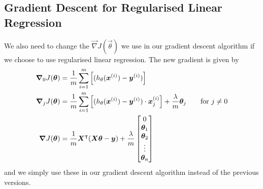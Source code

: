 \subsection{Gradient Descent for Regularised Linear Regression}
We also need to change the $\vec{\nabla}J(\vec{\theta})$ we use in our gradient descent algorithm if we choose to use regularised linear regression. The new gradient is given
by
\begin{align}
    \bm{\nabla}_0 J(\bm{\theta}) &= \frac{1}{m} \sum_{i=1}^{m}\left[(h_{\theta}(\bm{x}^{(i)})-\bm{y}^{(i)})\right] \\
    \bm{\nabla}_j J(\bm{\theta}) &= \frac{1}{m} \sum_{i=1}^{m}\left[(h_{\theta}(\bm{x}^{(i)})-\bm{y}^{(i)})\cdot\bm{x}^{(i)}_j\right] + \frac{\lambda}{m}\bm{\theta}_j \quad\quad \textrm{for } j \ne 0 \\
    \bm{\nabla} J(\bm{\theta}) &= \frac{1}{m} \bm{X}^{\intercal}(\bm{X\theta} - \bm{y}) + \frac{\lambda}{m}\begin{bmatrix}
        0 \\ \bm{\theta}_1 \\ \bm{\theta}_2 \\ \vdots \\ \bm{\theta}_n
    \end{bmatrix}
\end{align}
and we simply use these in our gradient descent algorithm instead of the previous versions.
